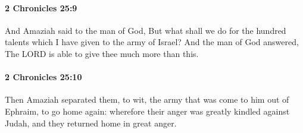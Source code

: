 		\paragraph{2 Chronicles 25:9} %
			\label{2CHRONICLES-25-9}

			And Amaziah said to the man of God, But what shall we do for the hundred talents which I have given to the army of Israel? And the man of God answered, The LORD is able to give thee much more than this.


		\paragraph{2 Chronicles 25:10} %
			\label{2CHRONICLES-25-10}

			Then Amaziah separated them, to wit, the army that was come to him out of Ephraim, to go home again: wherefore their anger was greatly kindled against Judah, and they returned home in great anger.

